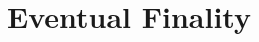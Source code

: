 \documentclass[envcountsect]{llncs}
\begin{document}
\frontmatter
\mainmatter

\title{\Large \bf Eventual Finality}


\author{}
\institute{}


\maketitle











\clearpage



\clearpage
\appendix

\end{document}
